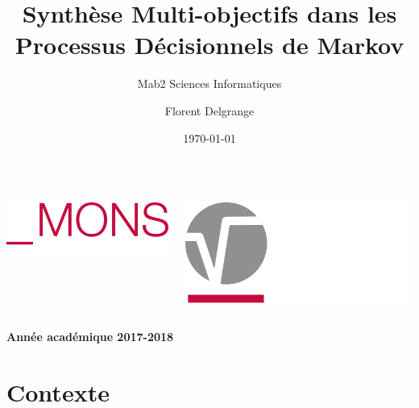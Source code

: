 \documentclass[compress]{beamer}
\title{Synthèse Multi-objectifs dans les Processus Décisionnels de Markov} %
\author{Florent Delgrange}
\subtitle{\normalsize Mab2 Sciences Informatiques}
\date{\today}
\theoremstyle{theorem}%
\begin{document}
  \begin{frame}[plain]
    \maketitle
    \vspace{.05\linewidth}
    \begin{columns}
      \begin{column}{0.5\linewidth}
        \includegraphics[width=0.55\linewidth]{UMONS+txt_white}
      \end{column}
      \begin{column}{0.5\linewidth}
        \flushright
        \vspace{-.02\linewidth}
        \includegraphics[width=0.5\linewidth]{UMONS_FS_white}
      \end{column}
    \end{columns}
    \begin{center}
      \color{white}
      \bfseries
      Année académique 2017-2018
    \end{center}
  \end{frame}


%

\section{Contexte}
\end{document}
